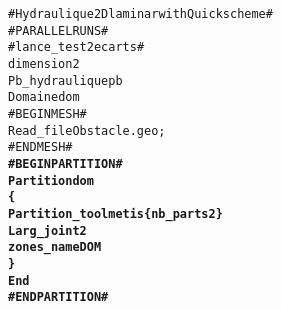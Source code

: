 \begin{alltt}
# Hydraulique 2D laminar with Quick scheme #
# PARALLEL RUNS #
# lance_test 2 ecarts #
dimension 2
Pb_hydraulique pb
Domaine dom
# BEGIN MESH #
Read_file Obstacle.geo ;
# END MESH #
{\bf{# BEGIN PARTITION #}}
{\bf{Partition dom}}
{\bf{\{}}
{\bf{    Partition_tool metis \{ nb_parts 2 \}}}
{\bf{    Larg_joint 2}}
{\bf{    zones_name DOM}}
{\bf{\}}}
{\bf{End}}
{\bf{# END PARTITION #}}
\end{alltt}
